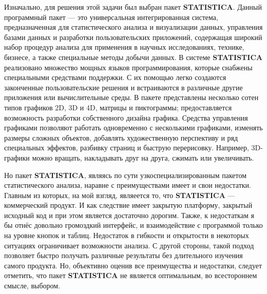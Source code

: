 Изначально, для решения этой задачи был выбран пакет \textbf{STATISTICA}. Данный программный пакет --- это универсальная интегрированная система, предназначенная для статистического анализа и визуализации данных, управления базами данных и разработки пользовательских приложений, содержащая широкий набор процедур анализа для применения в научных исследованиях, технике, бизнесе, а также специальные методы добычи данных.
В системе \textbf{STATISTICA} реализовано множество мощных языков программирования, которые снабжены специальными средствами поддержки. С их помощью легко создаются законченные пользовательские решения и встраиваются в различные другие приложения или вычислительные среды. 
В пакете представлены несколько сотен типов графиков 2D, 3D и 4D, матрицы и пиктограммы; предоставляется возможность разработки собственного дизайна графика. Средства управления графиками позволяют работать одновременно с несколькими графиками, изменять размеры сложных объектов, добавлять художественную перспективу и ряд специальных эффектов, разбивку страниц и быструю перерисовку. Например, 3D-графики можно вращать, накладывать друг на друга, сжимать или увеличивать.

Но пакет \textbf{STATISTICA}, являясь по сути узкоспециализированным пакетом статистического анализа, наравне с преимуществами имеет и свои недостатки. Главным из которых, на мой взгляд, являеется то, что \textbf{STATISTICA} --- коммерческий продукт. И как следствие имеет закрытую платформу, закрытый исходный код и при этом является достаточно дорогим. Также, к недостаткам я бы отнёс довольно громоздкий интерфейс, и взаимодействие с программой только на уровне кнопок и таблиц. Недостаток в гибкости и открытости в некоторых ситуациях ограничивает возможности анализа. С другой стороны, такой подход позволяет быстро получать различные результаты без длительного изучения самого продукта. Но, объективно оценив все преимущества и недостатки, следует отметить, что пакет \textbf{STATISTICA} не является оптимальным, во всестороннем смысле, выбором.

